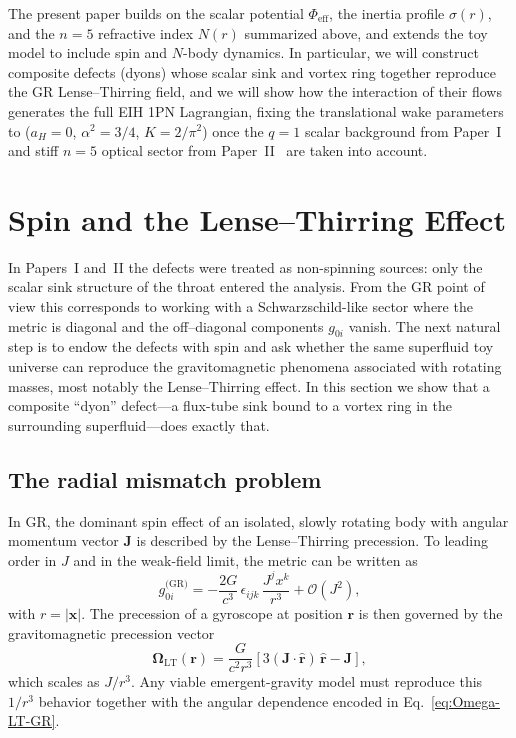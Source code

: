 \documentclass[11pt]{article}
\begin{document}
The present paper builds on the scalar potential $\Phi_{\mathrm{eff}}$,
the inertia profile $\sigma(r)$, and the $n=5$ refractive index
$N(r)$ summarized above, and extends the toy model to include spin
and $N$-body dynamics.
In particular, we will construct composite defects (dyons) whose
scalar sink and vortex ring together reproduce the GR Lense--Thirring
field, and we will show how the interaction of their flows generates
the full EIH 1PN Lagrangian, fixing the translational wake parameters to
($a_H=0$, $\alpha^2=3/4$, $K=2/\pi^2$) once the $q=1$ scalar background from
Paper~I~\cite{Norris:2025Orbits} and stiff $n=5$ optical sector from
Paper~II~\cite{Norris:Paper2} are taken into account.

\section{Spin and the Lense--Thirring Effect}
\label{sec:spin}

In Papers~I and~II the defects were treated as non-spinning sources:
only the scalar sink structure of the throat entered the analysis.
From the GR point of view this corresponds to working with a
Schwarzschild-like sector where the metric is diagonal and the
off–diagonal components $g_{0i}$ vanish.
The next natural step is to endow the defects with spin and ask
whether the same superfluid toy universe can reproduce the
gravitomagnetic phenomena associated with rotating masses, most
notably the Lense--Thirring effect.
In this section we show that a composite ``dyon'' defect---a flux-tube
sink bound to a vortex ring in the surrounding superfluid---does
exactly that.

\subsection{The radial mismatch problem}
\label{subsec:spin-mismatch}

In GR, the dominant spin effect of an isolated, slowly rotating body
with angular momentum vector $\mathbf{J}$ is described by the
Lense--Thirring precession.
To leading order in $J$ and in the weak-field limit, the metric can
be written as
\begin{equation}
  g_{0i}^{\text{(GR)}}
  = -\frac{2G}{c^3}\,
    \epsilon_{ijk}\,\frac{J^j x^k}{r^3}
  + \mathcal{O}(J^2),
\end{equation}
with $r = |\mathbf{x}|$.
The precession of a gyroscope at position $\mathbf{r}$ is then
governed by the gravitomagnetic precession vector
\begin{equation}
  \bm{\Omega}_{\text{LT}}(\mathbf{r})
  = \frac{G}{c^2 r^3}
    \left[3(\mathbf{J}\cdot\hat{\mathbf{r}})\,\hat{\mathbf{r}}
          - \mathbf{J}\right],
  \label{eq:Omega-LT-GR}
\end{equation}
which scales as $J/r^3$.
Any viable emergent-gravity model must reproduce this $1/r^3$
behavior together with the angular dependence encoded in
Eq.~\eqref{eq:Omega-LT-GR}.
\end{document}
